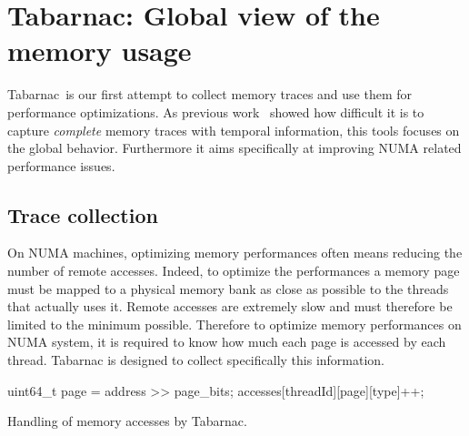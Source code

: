 \section{Tabarnac: Global view of the memory usage}
\label{sec:Tabarnac}

\acrfull{Tabarnac} is our first attempt to collect memory traces and use them for performance optimizations.
As previous work~\cite{Beniamine13Cartographier} showed how difficult it is to capture \emph{complete} memory traces with temporal information, this tools focuses on the global behavior.
Furthermore it aims specifically at improving \gls{NUMA} related performance issues.

\subsection{Trace collection}

On \gls{NUMA} machines, optimizing memory performances often means reducing the number of remote accesses.
Indeed, to optimize the performances a memory page must be mapped to a physical memory bank as close as possible to the threads that actually uses it.
Remote accesses are extremely slow and must therefore be limited to the minimum possible.
Therefore to optimize memory performances on \gls{NUMA} system, it is required to know how much each page is accessed by each thread.
\gls{Tabarnac} is designed to collect specifically this information.

\begin{algorithm}[htb]
    \begin{algorithmic}
            \State uint64\_t page = address >> page\_bits;
            \State accesses[threadId][page][type]++;
        \EndFunction
    \end{algorithmic}
    \caption{Handling of memory accesses by Tabarnac.}
    \label{alg:Tabarnac}
\end{algorithm}

